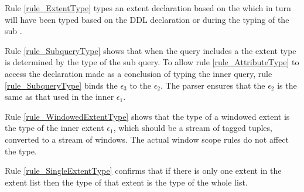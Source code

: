 Rule \ref{rule_ExtentType} types an extent declaration based on the  which in turn will have been typed based on the DDL  declaration or during the typing of the sub .


Rule \ref{rule_SubqueryType} shows that when the query includes a  the extent type is determined by the type of the sub query. To allow rule \ref{rule_AttributeType} to access the  declaration made as a conclusion of typing the inner query, rule \ref{rule_SubqueryType} binds the  $\epsilon_3$ to the  $\epsilon_2$. The parser ensures that the  $\epsilon_2$ is the same as that used in the inner  $\epsilon_1$.

Rule \ref{rule_WindowedExtentType} shows that the type of a windowed extent is the type of the inner extent $\epsilon_1$, which should be a stream of tagged tuples, converted to a stream of windows. 
The actual window scope rules do not affect the type.

Rule \ref{rule_SingleExtentType} confirms that if there is only one extent in the extent list then the type of that extent is the type of the whole list.

